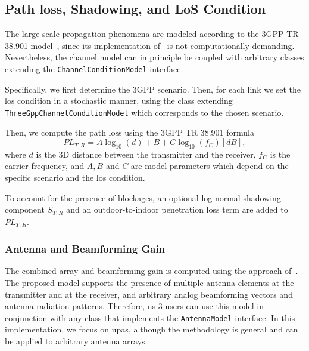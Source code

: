 \subsection{Path loss, Shadowing, and LoS Condition}
The large-scale propagation phenomena are modeled according to the 3GPP TR 38.901 model~\cite{TR38901}, since its implementation of~\cite{tommaso:20} is not computationally demanding. Nevertheless, the channel model can in principle be coupled with arbitrary classes extending the \texttt{Channel\-Condition\-Model} interface.

Specifically, we first determine the 3GPP scenario. Then, for each link we set the \gls{los} condition in a stochastic manner, using the class extending \texttt{Three\-Gpp\-Channel\-Condition\-Model} which corresponds to the chosen scenario.

Then, we compute the path loss using the 3GPP TR 38.901 formula
\begin{equation}
    PL_{T, R} = A \log_{10} (d) + B + C \log_{10} (f_C) [dB],
\end{equation}
where $d$ is the 3D distance between the transmitter and the receiver, $f_C$ is the carrier frequency, and $A, B$ and $C$ are model parameters which depend on the specific scenario and the \gls{los} condition.

To account for the presence of blockages, an optional log-normal shadowing component $S_{T, R}$ and an outdoor-to-indoor penetration loss term are added to $PL_{T, R}$.

\subsubsection{Antenna and Beamforming Gain}



The combined array and beamforming gain is computed using the approach of~\cite{8422746}. 
The proposed model supports the presence of multiple antenna elements at the transmitter and at the receiver, and arbitrary analog beamforming vectors and antenna radiation patterns. Therefore, ns-3 users can use this model in conjunction with any class that implements the \texttt{AntennaModel} interface.
In this implementation, we focus on \glspl{upa}, although the methodology is general and can be applied to arbitrary antenna arrays.

